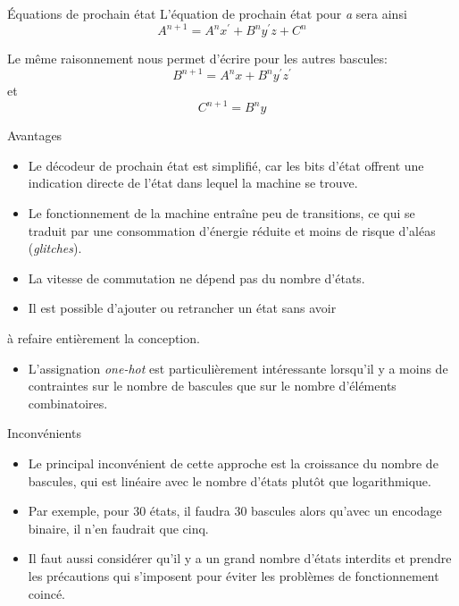 \documentclass[presentation]{beamer}
\begin{document}
\begin{frame}[label={sec:orgbbfa27d}]{Équations de prochain état}
L'équation de prochain état pour \emph{a} sera ainsi 
$$
A^{n+1} = A^{n}x^\prime + B^n y^\prime z + C^n
$$

Le même raisonnement nous permet d'écrire pour les autres bascules:
$$
B^{n+1} = A^{n}x + B^n y^\prime z^\prime
$$
et 
$$
C^{n+1} = B^n y
$$
\end{frame}

\begin{frame}[label={sec:orgac56b61}]{Avantages}
\begin{itemize}
\item Le décodeur de prochain état est simplifié, car les bits d'état offrent une indication directe de l'état dans lequel la machine se trouve.

\item Le fonctionnement de la machine entraîne peu de transitions, ce qui se traduit par une consommation d'énergie réduite et moins de risque d'aléas (\emph{glitches}).

\item La vitesse de commutation ne dépend pas du nombre d'états.

\item Il est possible d'ajouter ou retrancher un état sans avoir
\end{itemize}
à refaire entièrement la conception.

\begin{itemize}
\item L'assignation \emph{one-hot} est particulièrement intéressante lorsqu'il y a moins de contraintes sur le nombre de bascules que sur le nombre d'éléments combinatoires.
\end{itemize}
\end{frame}

\begin{frame}[label={sec:org9710294}]{Inconvénients}
\begin{itemize}
\item Le principal inconvénient de cette approche est la croissance du nombre de bascules, qui est linéaire avec le nombre d'états plutôt que logarithmique.

\item Par exemple, pour 30 états, il faudra 30 bascules alors qu'avec un encodage binaire, il n'en faudrait que cinq.

\item Il faut aussi considérer qu'il y a un grand nombre d'états interdits et prendre les précautions qui s'imposent pour éviter les problèmes de fonctionnement coincé.
\end{itemize}
\end{frame}
\end{document}
